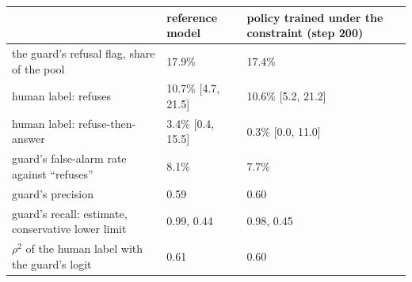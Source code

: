 \begin{tabular}{@{}p{5.6cm} p{3.0cm} p{4.6cm}@{}}
\toprule
 & \textbf{reference model} & \textbf{policy trained under the constraint (step 200)} \\
\midrule
the guard's refusal flag, share of the pool & 17.9\% & 17.4\% \\
human label: refuses & 10.7\% [4.7, 21.5] & 10.6\% [5.2, 21.2] \\
human label: refuse-then-answer & 3.4\% [0.4, 15.5] & 0.3\% [0.0, 11.0] \\
guard's false-alarm rate against ``refuses'' & 8.1\% & 7.7\% \\
guard's precision & 0.59 & 0.60 \\
guard's recall: estimate, conservative lower limit & 0.99, 0.44 & 0.98, 0.45 \\
$\rho^2$ of the human label with the guard's logit & 0.61 & 0.60 \\
\bottomrule
\end{tabular}
